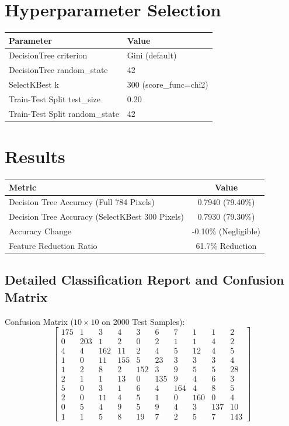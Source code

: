 \documentclass[12pt,a4paper]{article}
\begin{document}
\section{Hyperparameter Selection}

\begin{tabular}{ll}
\toprule
Parameter & Value\\
\midrule
DecisionTree criterion & Gini (default) \\
DecisionTree random\_state & 42 \\
SelectKBest k & 300 (score\_func=chi2) \\
Train-Test Split test\_size & 0.20 \\
Train-Test Split random\_state & 42 \\
\bottomrule
\end{tabular}

\section{Results}

\begin{tabular}{lc}
\toprule
Metric & Value\\
\midrule
Decision Tree Accuracy (Full 784 Pixels) & 0.7940 (79.40\%) \\
Decision Tree Accuracy (SelectKBest 300 Pixels) & 0.7930 (79.30\%) \\
Accuracy Change & -0.10\% (Negligible) \\
Feature Reduction Ratio & 61.7\% Reduction \\
\bottomrule
\end{tabular}

\subsection*{Detailed Classification Report and Confusion Matrix}

Confusion Matrix ($10 \times 10$ on 2000 Test Samples):
\begin{equation*}
\begin{bmatrix}
175 & 1 & 3 & 4 & 3 & 6 & 7 & 1 & 1 & 2 \\
0 & 203 & 1 & 2 & 0 & 2 & 1 & 1 & 4 & 2 \\
4 & 4 & 162 & 11 & 2 & 4 & 5 & 12 & 4 & 5 \\
1 & 0 & 11 & 155 & 5 & 23 & 3 & 3 & 3 & 4 \\
1 & 2 & 8 & 2 & 152 & 3 & 9 & 5 & 5 & 28 \\
2 & 1 & 1 & 13 & 0 & 135 & 9 & 4 & 6 & 3 \\
5 & 0 & 3 & 1 & 6 & 4 & 164 & 4 & 8 & 5 \\
2 & 0 & 11 & 4 & 5 & 1 & 0 & 160 & 0 & 4 \\
0 & 5 & 4 & 9 & 5 & 9 & 4 & 3 & 137 & 10 \\
1 & 1 & 5 & 8 & 19 & 7 & 2 & 5 & 7 & 143
\end{bmatrix}
\end{equation*}
\end{document}
